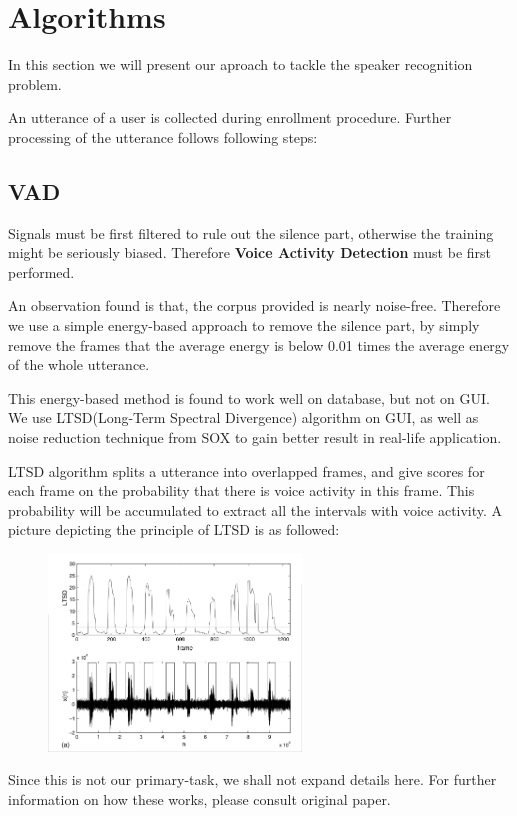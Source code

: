 \section{Algorithms}
	In this section we will present our aproach to tackle the speaker recognition problem.

    An utterance of a user is collected during enrollment procedure.
    Further processing of the utterance follows following steps:
    \subsection{VAD}
        Signals must be first filtered to rule out the silence part, otherwise the
        training might be seriously biased. Therefore \textbf{Voice Activity Detection} must
        be first performed.

        An observation found is that, the corpus provided is nearly noise-free.
        Therefore we use a simple energy-based approach
        to remove the silence part, by simply remove the frames that the average
        energy is below 0.01 times the average energy of the whole utterance.

        This energy-based method is found to work well on database, but not
        on GUI.
        We use LTSD(Long-Term Spectral Divergence) \cite{ltsd1}
        algorithm on GUI, as well as noise reduction technique from SOX\cite{sox} to gain better result in real-life application.

        LTSD algorithm splits a utterance into overlapped frames, and give scores for each frame on
        the probability that there is voice activity in this frame. This probability will be accumulated
        to extract all the intervals with voice activity. A picture depicting the principle of LTSD is as followed:

        \begin{figure}[H]
          \centering
          \includegraphics[width=0.6\textwidth]{img/ltsd.png}
        \end{figure}
		Since this is not our primary-task, we shall not expand details here. For further
		information on how these works, please consult original paper.


        
        

